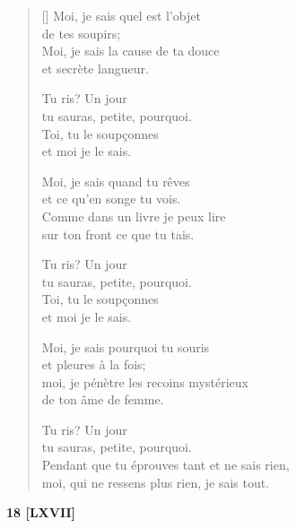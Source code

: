 \documentclass[a4paper,12pt]{book}
\begin{document}
\begin{verse}[\versewidth]
  Moi, je sais quel est l'objet \\
  de tes soupirs; \\
  Moi, je sais la cause de ta douce \\
  et secrète langueur.

  Tu ris? Un jour \\
  tu sauras, petite, pourquoi. \\
  Toi, tu le soupçonnes \\
  et moi je le sais.

  Moi, je sais quand tu rêves \\
  et ce qu'en songe tu vois. \\
  Comme dans un livre je peux lire \\
  sur ton front ce que tu tais.

  Tu ris? Un jour \\
  tu sauras, petite, pourquoi. \\
  Toi, tu le soupçonnes \\
  et moi je le sais.

  Moi, je sais pourquoi tu souris \\
  et pleures à la fois; \\
  moi, je pénètre les recoins mystérieux \\
  de ton âme de femme.

  Tu ris? Un jour \\
  tu sauras, petite, pourquoi. \\
  Pendant que tu éprouves tant et ne sais rien, \\
  moi, qui ne ressens plus rien, je sais tout.
\end{verse}

\bigskip

\begin{center}
  \textbf{18 [LXVII]}
\end{center}

\settowidth{\versewidth}{que de bien dormir, et ronfler comme un sous-chantre.}
\end{document}
